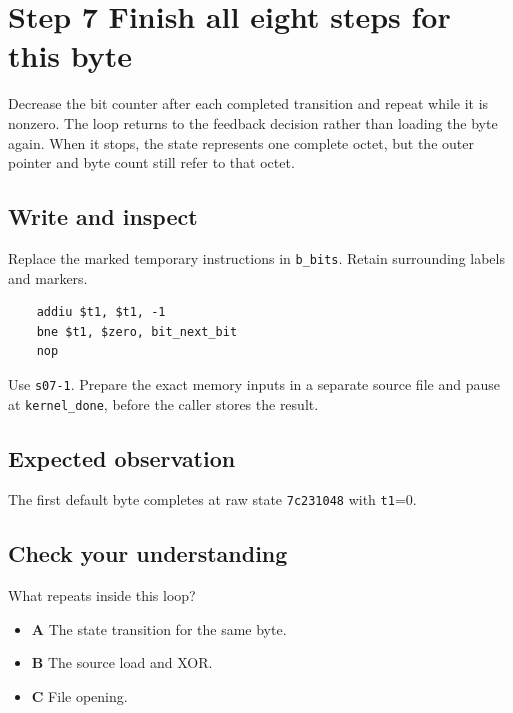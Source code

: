 \section{Step 7 Finish all eight steps for this byte}\label{crc-s07}

Decrease the bit counter after each completed transition and repeat while it is nonzero. The loop returns to the feedback decision rather than loading the byte again. When it stops, the state represents one complete octet, but the outer pointer and byte count still refer to that octet.

\subsection{Write and inspect}
Replace the marked temporary instructions in \texttt{b\_bits}. Retain surrounding labels and markers.

\begin{verbatim}
    addiu $t1, $t1, -1
    bne $t1, $zero, bit_next_bit
    nop
\end{verbatim}

Use \texttt{s07-1}. Prepare the exact memory inputs in a separate source file and pause at \texttt{kernel\_done}, before the caller stores the result.

\subsection{Expected observation}
The first default byte completes at raw state \texttt{7c231048} with \texttt{t1}=0.

\subsection{Check your understanding}
What repeats inside this loop?

\begin{itemize}
  \item \textbf{A} The state transition for the same byte.
  \item \textbf{B} The source load and XOR.
  \item \textbf{C} File opening.
\end{itemize}
